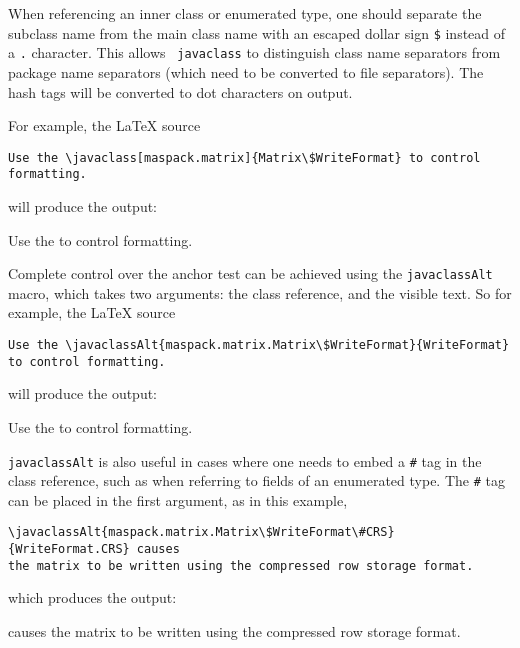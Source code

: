 \documentclass{article}
\begin{document}
When referencing an inner class or enumerated type, one should
separate the subclass name from the main class name with an escaped
dollar sign {\tt \$} instead of a {\tt .} character. This allows {\tt \BKS
javaclass} to distinguish class name separators from package name
separators (which need to be converted to file separators). The
hash tags will be converted to dot characters on output.

For example, the LaTeX source 

\begin{lstlisting}[]
Use the \javaclass[maspack.matrix]{Matrix\$WriteFormat} to control formatting.
\end{lstlisting}

will produce the output:

Use the  to control formatting.

Complete control over the anchor test can be
achieved using the {\tt \BKS javaclassAlt} macro, which takes two
arguments: the class reference, and the visible text. So for example,
the LaTeX source

\begin{lstlisting}[]
Use the \javaclassAlt{maspack.matrix.Matrix\$WriteFormat}{WriteFormat}
to control formatting.
\end{lstlisting}

will produce the output:

Use the 
to control formatting.

{\tt \BKS javaclassAlt} is also useful in cases where one needs to
embed a {\tt \#} tag in the class reference, such as when referring to
fields of an enumerated type. The {\tt \#} tag can be placed
in the first argument, as in this example,

\begin{lstlisting}[]
\javaclassAlt{maspack.matrix.Matrix\$WriteFormat\#CRS}{WriteFormat.CRS} causes
the matrix to be written using the compressed row storage format.
\end{lstlisting}

which produces the output:

 causes
the matrix to be written using the compressed row storage format.

%
%
%
\end{document}
